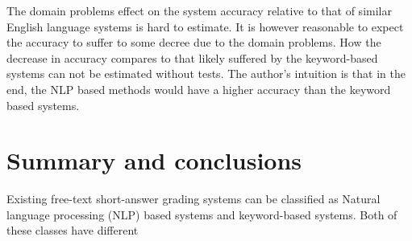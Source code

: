 \documentclass[english]{tktltiki2}
\theoremstyle{definition}
\theoremstyle{remark}
\begin{document}
The domain problems effect on the system accuracy relative to that of similar English language systems is hard to estimate. It is however reasonable to expect the accuracy to suffer to some decree due to the domain problems. How the decrease in accuracy compares to that likely suffered by the keyword-based systems can not be estimated without tests. The author's intuition is that in the end, the NLP based methods would have a higher accuracy than the keyword based systems.

\section{Summary and conclusions}

Existing free-text short-answer grading systems can be classified as Natural language processing (NLP) based systems and keyword-based systems. Both of these classes have different 







\end{document}
